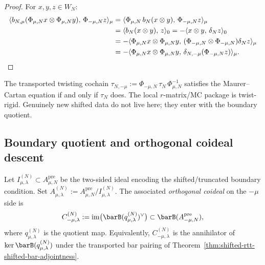 \begin{proof}
For $x, y, z \in W_N$:
\begin{align*}
\langle b_{N,\mu}(\Phi_{\mu,N}x \otimes \Phi_{\mu,N}y),\,
 \Phi_{-\mu,N}z\rangle_\mu
&= \langle \Phi_{\mu,N}\,b_N(x \otimes y),\,
 \Phi_{-\mu,N}z \rangle_\mu \\
&= \langle b_N(x \otimes y),\, z \rangle_0
 = -\langle x \otimes y,\, \delta_N z \rangle_0 \\
&= -\langle \Phi_{\mu,N}x \otimes \Phi_{\mu,N}y,\,
 (\Phi_{-\mu,N} \otimes \Phi_{-\mu,N})\delta_N z
 \rangle_\mu \\
&= -\langle \Phi_{\mu,N}x \otimes \Phi_{\mu,N}y,\,
 \delta_{N,-\mu}(\Phi_{-\mu,N}z)\rangle_\mu.
\qedhere
\end{align*}
\end{proof}

\begin{remark}
\label{rem:shifted-rtt-twist-rigidity}
The transported twisting cochain
$\tau_{N,-\mu} := \Phi_{-\mu,N}\,\tau_N\,\Phi_{\mu,N}^{-1}$
satisfies the Maurer--Cartan equation if and only if $\tau_N$
does. The local $r$-matrix/MC package is twist-rigid. Genuinely
new shifted data do not live here; they enter with the boundary
quotient.
\end{remark}


\subsection{Boundary quotient and orthogonal coideal descent}
\label{subsec:boundary-quotient-coideal}

\begin{definition}
\label{def:shifted-rtt-boundary-quotient}
Let $I_{\mu,\lambda}^{(N)} \subset A_{\mu,N}^{\mathrm{pre}}$ be the
two-sided ideal encoding the shifted/truncated boundary condition.
Set
$A_{\mu,\lambda}^{(N)} := A_{\mu,N}^{\mathrm{pre}} /
I_{\mu,\lambda}^{(N)}$.
The associated \emph{orthogonal coideal} on the $-\mu$ side is
\[
C_{-\mu,\lambda}^{(N)}
:= \operatorname{im}\bigl(\barB(q_{\mu,\lambda}^{(N)})^\vee\bigr)
\subset \barB(A_{-\mu,N}^{\mathrm{pre}}),
\]
where $q_{\mu,\lambda}^{(N)}$ is the quotient map.
Equivalently, $C_{-\mu,\lambda}^{(N)}$ is the annihilator
of $\ker\barB(q_{\mu,\lambda}^{(N)})$ under the transported bar
pairing of
Theorem~\textup{\ref{thm:shifted-rtt-shifted-bar-adjointness}}.
\end{definition}

